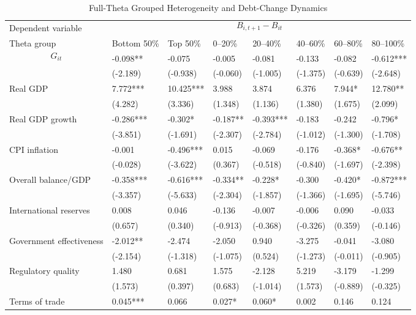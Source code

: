 \begin{table}[H]\centering
\begin{threeparttable}
\caption{Full-Theta Grouped Heterogeneity and Debt-Change Dynamics}
\label{tab:theta_group_heterogeneity_debt}
\scriptsize
\begin{tabularx}{\textwidth}{lYYYYYYY}
\toprule
Dependent variable &  \\
\cmidrule(lr){2-8}
Theta group & Bottom 50\% & Top 50\% & 0--20\% & 20--40\% & 40--60\% & 60--80\% & 80--100\% \\
\midrule
$$G_{it}$$ & -0.098** & -0.075 & -0.005 & -0.081 & -0.133 & -0.082 & -0.612*** \\
  & (-2.189) & (-0.938) & (-0.060) & (-1.005) & (-1.375) & (-0.639) & (-2.648) \\
Real GDP & 7.772*** & 10.425*** & 3.988 & 3.874 & 6.376 & 7.944* & 12.780** \\
  & (4.282) & (3.336) & (1.348) & (1.136) & (1.380) & (1.675) & (2.099) \\
Real GDP growth & -0.286*** & -0.302* & -0.187** & -0.393*** & -0.183 & -0.242 & -0.796* \\
  & (-3.851) & (-1.691) & (-2.307) & (-2.784) & (-1.012) & (-1.300) & (-1.708) \\
CPI inflation & -0.001 & -0.496*** & 0.015 & -0.069 & -0.176 & -0.368* & -0.676** \\
  & (-0.028) & (-3.622) & (0.367) & (-0.518) & (-0.840) & (-1.697) & (-2.398) \\
Overall balance/GDP & -0.358*** & -0.616*** & -0.334** & -0.228* & -0.300 & -0.420* & -0.872*** \\
  & (-3.357) & (-5.633) & (-2.304) & (-1.857) & (-1.366) & (-1.695) & (-5.746) \\
International reserves & 0.008 & 0.046 & -0.136 & -0.007 & -0.006 & 0.090 & -0.033 \\
  & (0.657) & (0.340) & (-0.913) & (-0.368) & (-0.326) & (0.359) & (-0.146) \\
Government effectiveness & -2.012** & -2.474 & -2.050 & 0.940 & -3.275 & -0.041 & -3.080 \\
  & (-2.154) & (-1.318) & (-1.075) & (0.524) & (-1.273) & (-0.011) & (-0.905) \\
Regulatory quality & 1.480 & 0.681 & 1.575 & -2.128 & 5.219 & -3.179 & -1.299 \\
  & (1.573) & (0.397) & (0.683) & (-1.014) & (1.573) & (-0.889) & (-0.325) \\
Terms of trade & 0.045*** & 0.066 & 0.027* & 0.060* & 0.002 & 0.146 & 0.124 \\

\end{tabularx}
\end{threeparttable}
\end{table}
